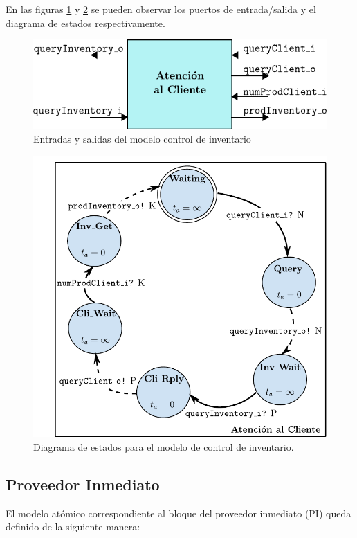 \documentclass[10pt]{article}
\begin{document}
En las figuras \ref{fig:AC-esquematico} y \ref{fig:AC-estados} se pueden observar los puertos de entrada/salida y el diagrama de estados respectivamente.

\begin{figure}[h]
	\centering
	\includegraphics{img/AC-esquematico}
	\caption{Entradas y salidas del modelo control de inventario}
	\label{fig:AC-esquematico}
\end{figure}

\begin{figure}[h]
	\centering
	\includegraphics{img/atencionClientedevsgraph}
	\caption{Diagrama de estados para el modelo de control de inventario.}
	\label{fig:AC-estados}
\end{figure}
\FloatBarrier

\subsection{Proveedor Inmediato\label{sec:PI}}
El modelo atómico correspondiente al bloque del proveedor inmediato (PI) queda definido de la siguiente manera:
\end{document}
